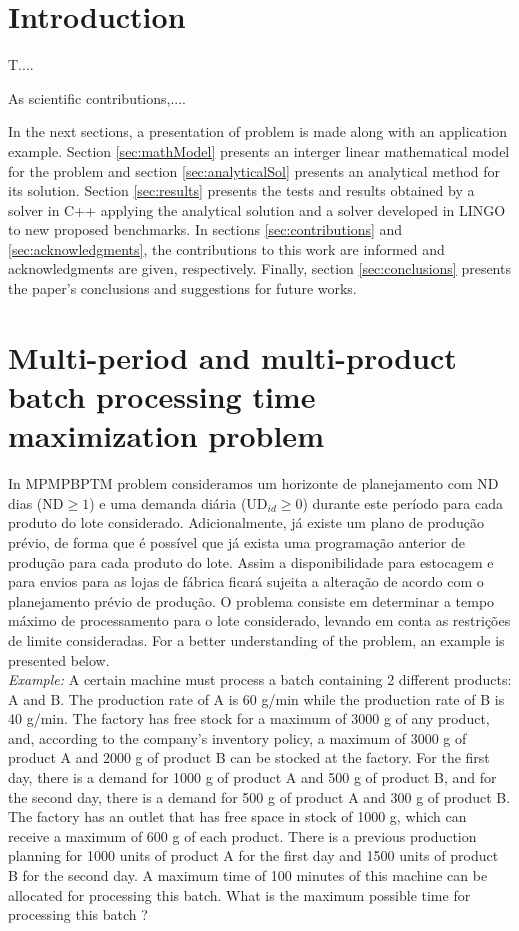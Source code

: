\documentclass[authoryear,preprint,12pt]{elsarticle}
\begin{document}

\section{Introduction}
\label{sec:intro}

T....

As scientific contributions,....

In the next sections, a presentation of problem is made along with an application example. Section \ref{sec:mathModel} presents an interger linear mathematical model for the problem and section \ref{sec:analyticalSol} presents an analytical method for its solution. Section \ref{sec:results} presents the tests and results obtained by a solver in C++ applying the analytical solution and a solver developed in LINGO to new proposed benchmarks. In sections \ref{sec:contributions} and \ref{sec:acknowledgments}, the contributions to this work are informed and acknowledgments are given, respectively. Finally, section \ref{sec:conclusions} presents the paper's conclusions and suggestions for future works.

\section{Multi-period and multi-product batch processing time maximization problem}
\label{sec:MBPTMP}

In MPMPBPTM problem consideramos um horizonte de planejamento com $\textrm{ND}$ dias ($\textrm{ND} \geq 1$) e uma demanda diária ($\textrm{UD}_{id} \geq 0$) durante este período para cada produto do lote considerado. Adicionalmente, já existe um plano de produção prévio, de forma que é possível que já exista uma programação anterior de produção para cada produto do lote. Assim a disponibilidade para estocagem e para envios para as lojas de fábrica ficará sujeita a alteração de acordo com o planejamento prévio de produção. O problema consiste em determinar a tempo máximo de processamento para o lote considerado, levando em conta as restrições de limite consideradas. For a better understanding of the problem, an example is presented below. \\

\emph{Example:} A certain machine must process a batch containing 2 different products: A and B. The production rate of A is 60 g/min while the production rate of B is 40 g/min. The factory has free stock for a maximum of 3000 g of any product, and, according to the company's inventory policy, a maximum of 3000 g of product A and 2000 g of product B can be stocked at the factory. For the first day, there is a demand for 1000 g of product A and 500 g of product B, and for the second day, there is a demand for 500 g of product A and 300 g of product B. The factory has an outlet that has free space in stock of 1000 g, which can receive a maximum of 600 g of each product. There is a previous production planning for 1000 units of product A for the first day and 1500 units of product B for the second day. A maximum time of 100 minutes of this machine can be allocated for processing this batch. What is the maximum possible time for processing this batch ?  \\
\end{document}
